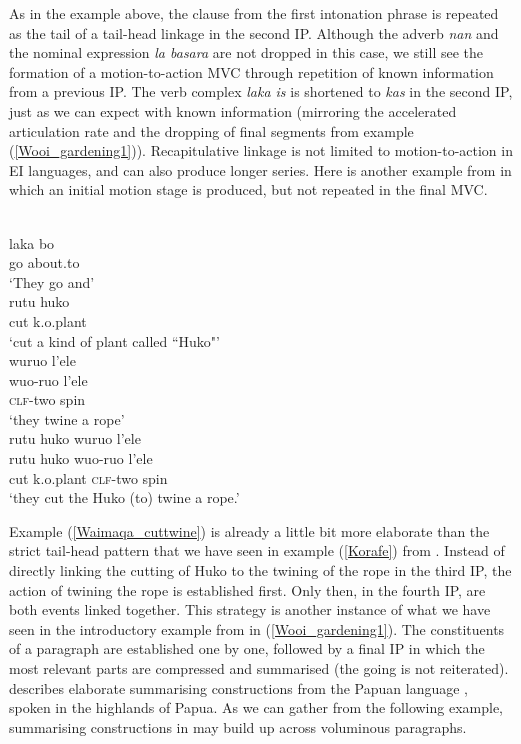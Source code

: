 As in the  example above, the clause from the first intonation phrase is repeated as the tail of a tail-head linkage in the second IP. Although the adverb \textit{nan} and the nominal expression \textit{la basara} are not dropped in this case, we still see the formation of a motion-to-action MVC through repetition of known information from a previous IP. The verb complex \textit{laka is} is shortened to \textit{kas} in the second IP, just as we can expect with known information (mirroring the accelerated articulation rate and the dropping of final segments from example (\ref{Wooi_gardening1})). Recapitulative linkage is not limited to motion-to-action in EI languages, and can also produce longer series. Here is another example from  in which an initial motion stage is produced, but not repeated in the final MVC. 

\ea \label{Waimaqa_cuttwine}
\\
\ea
\gll laka bo \\
go about.to \\
\glft `They go and' \\
\ex
\gll rutu huko \\
cut k.o.plant \\
\glft `cut a kind of plant called ``Huko"' \\
\ex
\glll wuruo l'ele \\
wuo-ruo l'ele \\
\textsc{clf}-two spin \\
\glft `they twine a rope' \\
\ex
\glll rutu huko wuruo l'ele \\
rutu huko wuo-ruo l'ele \\
cut k.o.plant \textsc{clf}-two spin \\
\glft `they cut the Huko (to) twine a rope.'\\
\z
\z

Example (\ref{Waimaqa_cuttwine}) is already a little bit more elaborate than the strict tail-head pattern that we have seen in example (\ref{Korafe}) from . Instead of directly linking the cutting of Huko to the twining of the rope in the third IP, the action of twining the rope is established first. Only then, in the fourth IP, are both events linked together. This strategy is another instance of what we have seen in the introductory example from  in (\ref{Wooi_gardening1}). The constituents of a paragraph are established one by one, followed by a final IP in which the most relevant parts are compressed and summarised (the going is not reiterated). \citet{heeschen1998eipo} describes elaborate summarising constructions from the Papuan language , spoken in the highlands of  Papua. As we can gather from the following example, summarising constructions in  may build up across voluminous paragraphs.

